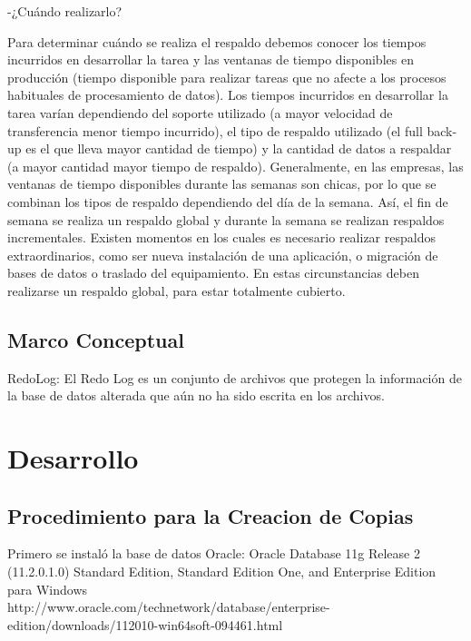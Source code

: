 \documentclass[12pt,letterpaper]{article}
\begin{document}
\newpage

-¿Cuándo realizarlo? 

Para determinar cuándo se realiza el respaldo debemos conocer los tiempos incurridos en desarrollar la tarea y las ventanas de tiempo disponibles en producción (tiempo disponible para realizar tareas que no afecte a los procesos habituales de procesamiento de datos). Los tiempos incurridos en desarrollar la tarea varían dependiendo del soporte utilizado (a mayor velocidad de transferencia menor tiempo incurrido), el tipo de respaldo utilizado (el full back-up es el que lleva mayor cantidad de tiempo) y la cantidad de datos a respaldar (a mayor cantidad mayor tiempo de respaldo). 
Generalmente, en las empresas, las ventanas de tiempo disponibles durante las semanas son chicas, por lo que se combinan los tipos de respaldo  dependiendo del día de la semana. Así, el fin de semana se realiza un respaldo global y durante la semana se realizan respaldos incrementales. Existen momentos en los cuales es necesario realizar respaldos extraordinarios, como ser nueva instalación de una aplicación, o migración de bases de datos o traslado del equipamiento. En estas circunstancias deben realizarse un respaldo global, para estar totalmente cubierto. \\







\subsection{Marco Conceptual}

\newpage

RedoLog: El Redo Log es un conjunto de archivos que protegen la información de la base de datos alterada que aún no ha sido escrita en los archivos.
\section{Desarrollo}
\subsection{Procedimiento para la Creacion de Copias}
Primero se instaló la base de datos Oracle:
Oracle Database 11g Release 2 (11.2.0.1.0)
Standard Edition, Standard Edition One, and Enterprise Edition para Windows\\
http://www.oracle.com/technetwork/database/enterprise-edition/downloads/112010-win64soft-094461.html\\
\end{document}
